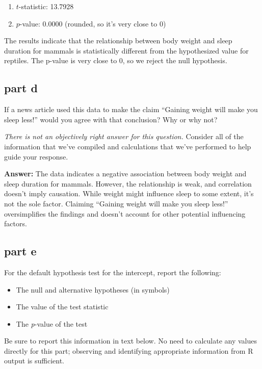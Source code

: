 \documentclass[
]{article}
\providecommand{\tightlist}{%
  \setlength{\itemsep}{0pt}\setlength{\parskip}{0pt}}
\begin{document}
\begin{enumerate}
\def\labelenumi{\arabic{enumi}.}
\tightlist
\item
  \(t\)-statistic: 13.7928
\item
  \(p\)-value: 0.0000 (rounded, so it's very close to 0)
\end{enumerate}

The results indicate that the relationship between body weight and sleep
duration for mammals is statistically different from the hypothesized
value for reptiles. The p-value is very close to 0, so we reject the
null hypothesis.

\subsection{part d}\label{part-d-2}

If a news article used this data to make the claim ``Gaining weight will
make you sleep less!'' would you agree with that conclusion? Why or why
not?

\emph{There is not an objectively right answer for this question.}
Consider all of the information that we've compiled and calculations
that we've performed to help guide your response.

\textbf{Answer:} The data indicates a negative association between body
weight and sleep duration for mammals. However, the relationship is
weak, and correlation doesn't imply causation. While weight might
influence sleep to some extent, it's not the sole factor. Claiming
``Gaining weight will make you sleep less!'' oversimplifies the findings
and doesn't account for other potential influencing factors.

\subsection{part e}\label{part-e-2}

For the default hypothesis test for the intercept, report the following:

\begin{itemize}
\tightlist
\item
  The null and alternative hypotheses (in symbols)
\item
  The value of the test statistic
\item
  The \emph{p}-value of the test
\end{itemize}

Be sure to report this information in text below. No need to calculate
any values directly for this part; observing and identifying appropriate
information from R output is sufficient.
\end{document}
